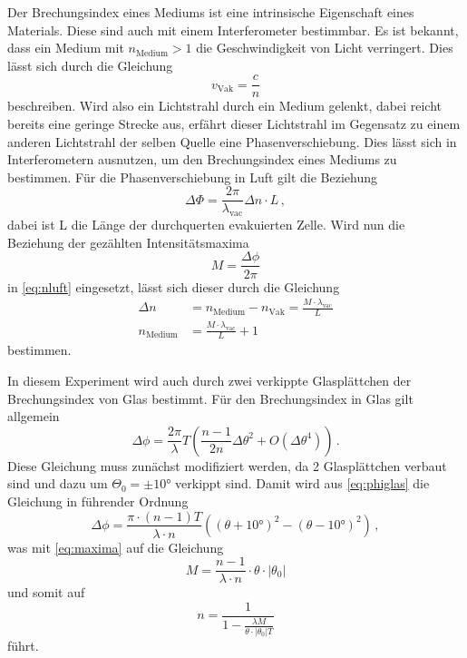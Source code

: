 Der Brechungsindex eines Mediums ist eine intrinsische Eigenschaft eines Materials.
Diese sind auch mit einem Interferometer bestimmbar.
Es ist bekannt, dass ein Medium mit $n_\text{Medium} > 1$ die Geschwindigkeit von Licht verringert.
Dies lässt sich durch die Gleichung
\begin{equation*}
    v_\text{Vak} = \frac{c}{n}
\end{equation*}
beschreiben. Wird also ein Lichtstrahl durch ein Medium gelenkt, dabei reicht bereits eine geringe Strecke aus, erfährt dieser Lichtstrahl im Gegensatz zu einem anderen Lichtstrahl der selben Quelle eine Phasenverschiebung.
Dies lässt sich in Interferometern ausnutzen, um den Brechungsindex eines Mediums zu bestimmen.
Für die Phasenverschiebung in Luft gilt die Beziehung \cite{v64}
\begin{equation} \label{eq:nluft}
    \Delta \Phi = \frac{2 \pi}{\lambda_\text{vac}} \Delta n \cdot L \, ,
\end{equation}
dabei ist L die Länge der durchquerten evakuierten Zelle.
Wird nun die Beziehung der gezählten Intensitätsmaxima 
\begin{equation} \label{eq:maxima}
    M = \frac{\Delta \phi}{2 \pi}
  \end{equation}
in \autoref{eq:nluft} eingesetzt, lässt sich dieser durch die Gleichung
\begin{align}
    \Delta n &= n_\text{Medium} - n_\text{Vak} = \frac{M \cdot \lambda_\text{vac}}{L} \\
    n_\text{Medium} &= \frac{M \cdot \lambda_\text{vac}}{L} + 1
\end{align}
bestimmen.

In diesem Experiment wird auch durch zwei verkippte Glasplättchen der Brechungsindex von Glas bestimmt.
Für den Brechungsindex in Glas gilt allgemein \cite{v64}
\begin{equation}\label{eq:phiglas}
    \Delta \phi = \frac{2\pi}{\lambda}T\left(\frac{n-1}{2n}\Delta \theta^2+O( \Delta \theta^4)\right) \, .
\end{equation}
Diese Gleichung muss zunächst modifiziert werden, da 2 Glasplättchen verbaut sind und dazu um $\Theta_0 = \pm 10°$ verkippt sind.
Damit wird aus \autoref{eq:phiglas} die Gleichung in führender Ordnung
\begin{equation}
    \Delta \phi = \frac{\pi \cdot (n - 1) T}{\lambda \cdot n} \left(\left( \theta + 10° \right)^2 - \left( \theta - 10° \right)^2\right) \, ,
\end{equation}
was mit \autoref{eq:maxima} auf die Gleichung
\begin{equation*}
    M = \frac{n - 1}{\lambda \cdot n} \cdot \theta \cdot |\theta_0|
\end{equation*}
und somit auf
\begin{equation} \label{eq:n_Glas}
    n = \frac{1}{1- \frac{\lambda M}{ \theta \cdot |\theta_0| T}}
\end{equation}
führt.